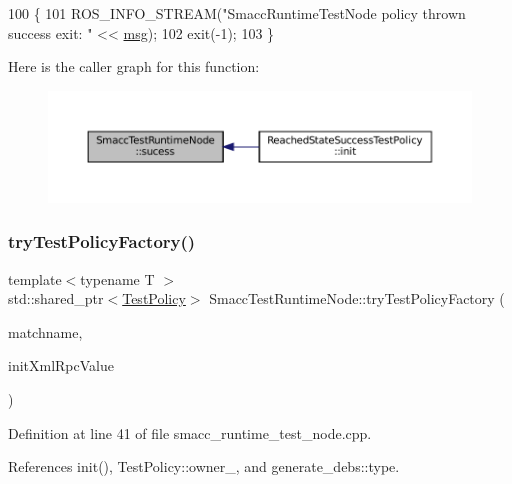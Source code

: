 \begin{DoxyCode}
100   \{
101     ROS\_INFO\_STREAM(\textcolor{stringliteral}{"SmaccRuntimeTestNode policy thrown success exit: "} << \hyperlink{namespacebattery__monitor__node_ab1920c64448816edd4064e494275fdff}{msg});
102     exit(-1);
103   \}
\end{DoxyCode}
Here is the caller graph for this function\+:
\nopagebreak
\begin{figure}[H]
\begin{center}
\leavevmode
\includegraphics[width=350pt]{classSmaccTestRuntimeNode_ae77d02680e11f7e128841b0ab9ed6e13_icgraph}
\end{center}
\end{figure}
\mbox{\label{classSmaccTestRuntimeNode_ab92c2ceafa6b65919f306c1818fae551}} 
\subsubsection{\texorpdfstring{try\+Test\+Policy\+Factory()}{tryTestPolicyFactory()}}
{\footnotesize\ttfamily template$<$typename T $>$ \\
std\+::shared\+\_\+ptr$<$\hyperlink{classTestPolicy}{Test\+Policy}$>$ Smacc\+Test\+Runtime\+Node\+::try\+Test\+Policy\+Factory (\begin{DoxyParamCaption}\item[{std\+::string}]{matchname,  }\item[{Xml\+Rpc\+::\+Xml\+Rpc\+Value \&}]{init\+Xml\+Rpc\+Value }\end{DoxyParamCaption})\hspace{0.3cm}{\ttfamily [inline]}}



Definition at line 41 of file smacc\+\_\+runtime\+\_\+test\+\_\+node.\+cpp.



References init(), Test\+Policy\+::owner\+\_\+, and generate\+\_\+debs\+::type.


